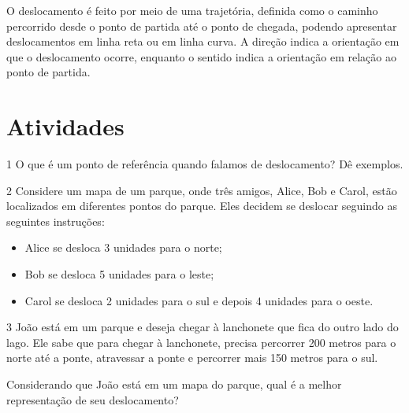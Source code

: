 O deslocamento é feito por meio de uma trajetória, definida como o
caminho percorrido desde o ponto de partida até o ponto de chegada,
podendo apresentar deslocamentos em linha reta ou em linha curva. A
direção indica a orientação em que o deslocamento ocorre, enquanto o
sentido indica a orientação em relação ao ponto de partida.

\section{Atividades}

\num{1} O que é um ponto de referência quando falamos de deslocamento? Dê
exemplos.


\num{2} Considere um mapa de um parque, onde três amigos, Alice, Bob e Carol,
estão localizados em diferentes pontos do parque. Eles decidem se
deslocar seguindo as seguintes instruções:

\begin{itemize}
\item Alice se desloca 3 unidades para o norte; 
\item Bob se desloca 5
unidades para o leste; 
\item Carol se desloca 2 unidades para o sul e
depois 4 unidades para o oeste.
\end{itemize}


\num{3} João está em um parque e deseja chegar à lanchonete que fica do outro
lado do lago. Ele sabe que para chegar à lanchonete, precisa percorrer
200 metros para o norte até a ponte, atravessar a ponte e percorrer mais
150 metros para o sul.

Considerando que João está em um mapa do parque, qual é a melhor
representação de seu deslocamento?


